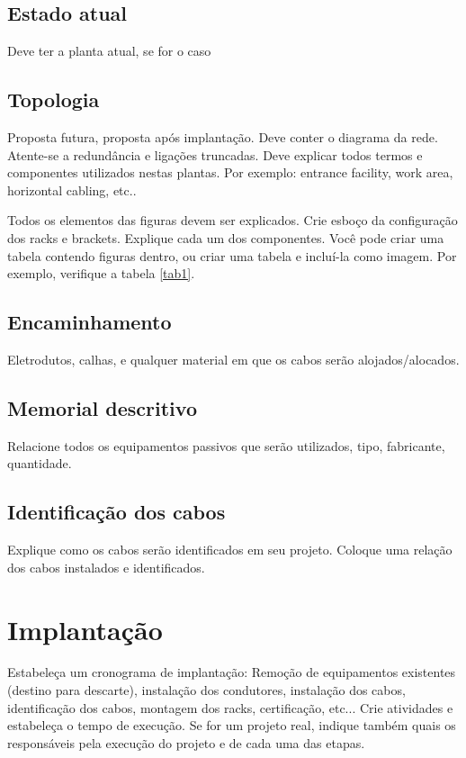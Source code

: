 \documentclass[	DIV=calc,%
							paper=a4,%
							fontsize=12pt,%
							onecolumn]{scrartcl}	 					%
\begin{document}
\subsection{Estado atual}
Deve ter a planta atual, se for o caso

\subsection{Topologia}
Proposta futura, proposta após implantação.
Deve conter o diagrama da rede. Atente-se a redundância  e ligações truncadas.
Deve explicar todos termos e componentes utilizados nestas plantas. Por exemplo: entrance facility, work area, horizontal cabling, etc..

Todos os elementos das figuras devem ser explicados. 
Crie esboço da configuração dos racks e brackets. Explique cada um dos componentes. Você pode criar uma tabela contendo figuras dentro, ou criar uma tabela e incluí-la como imagem. Por exemplo, verifique a tabela \ref{tab1}.



\subsection{Encaminhamento}
Eletrodutos, calhas, e qualquer material em que os cabos serão alojados/alocados.

\subsection{Memorial descritivo}

Relacione todos os equipamentos passivos que serão utilizados, tipo, fabricante, quantidade.

\subsection{Identificação dos cabos}
Explique como os cabos serão identificados em seu projeto. Coloque uma relação dos cabos instalados e identificados.

\section{Implantação}
Estabeleça um cronograma de implantação:
Remoção de equipamentos existentes (destino para descarte), instalação dos condutores, instalação dos cabos, 
identificação dos cabos, montagem dos racks, certificação, etc... Crie atividades e estabeleça o tempo de execução. Se for um projeto real, indique também quais os responsáveis pela execução do projeto e de cada uma das etapas.
\end{document}
